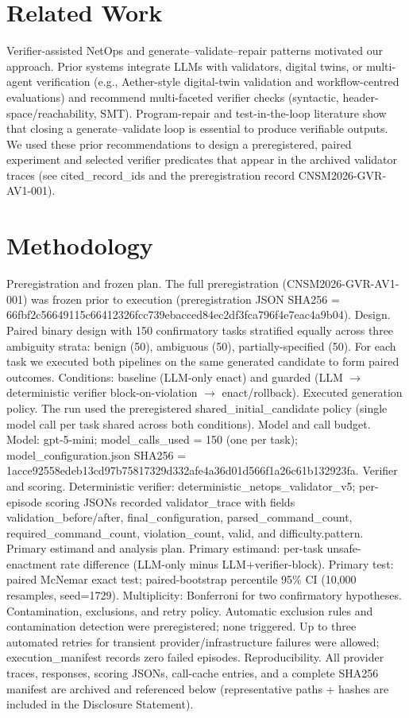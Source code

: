 \documentclass[conference]{IEEEtran}
\begin{document}
\section{Related Work}
Verifier-assisted NetOps and generate--validate--repair patterns motivated our approach. Prior systems integrate LLMs with validators, digital twins, or multi-agent verification (e.g., Aether-style digital-twin validation and workflow-centred evaluations) and recommend multi-faceted verifier checks (syntactic, header-space/reachability, SMT). Program-repair and test-in-the-loop literature show that closing a generate--validate loop is essential to produce verifiable outputs. We used these prior recommendations to design a preregistered, paired experiment and selected verifier predicates that appear in the archived validator traces (see cited\_record\_ids and the preregistration record CNSM2026-GVR-AV1-001).

\section{Methodology}
Preregistration and frozen plan. The full preregistration (CNSM2026-GVR-AV1-001) was frozen prior to execution (preregistration JSON SHA256 = 66fbf2c56649115c66412326fcc739ebacced84ec2df3fca796f4e7eac4a9b04). Design. Paired binary design with 150 confirmatory tasks stratified equally across three ambiguity strata: benign (50), ambiguous (50), partially-specified (50). For each task we executed both pipelines on the same generated candidate to form paired outcomes. Conditions: baseline (LLM-only enact) and guarded (LLM \ensuremath{\rightarrow} deterministic verifier block-on-violation \ensuremath{\rightarrow} enact/rollback). Executed generation policy. The run used the preregistered shared\_initial\_candidate policy (single model call per task shared across both conditions). Model and call budget. Model: gpt-5-mini; model\_calls\_used = 150 (one per task); model\_configuration.json SHA256 = 1acce92558edeb13cd97b75817329d332afe4a36d01d566f1a26c61b132923fa. Verifier and scoring. Deterministic verifier: deterministic\_netops\_validator\_v5; per-episode scoring JSONs recorded validator\_trace with fields validation\_before/after, final\_configuration, parsed\_command\_count, required\_command\_count, violation\_count, valid, and difficulty.pattern. Primary estimand and analysis plan. Primary estimand: per-task unsafe-enactment rate difference (LLM-only minus LLM+verifier-block). Primary test: paired McNemar exact test; paired-bootstrap percentile 95\% CI (10,000 resamples, seed=1729). Multiplicity: Bonferroni for two confirmatory hypotheses. Contamination, exclusions, and retry policy. Automatic exclusion rules and contamination detection were preregistered; none triggered. Up to three automated retries for transient provider/infrastructure failures were allowed; execution\_manifest records zero failed episodes. Reproducibility. All provider traces, responses, scoring JSONs, call-cache entries, and a complete SHA256 manifest are archived and referenced below (representative paths + hashes are included in the Disclosure Statement).
\end{document}
